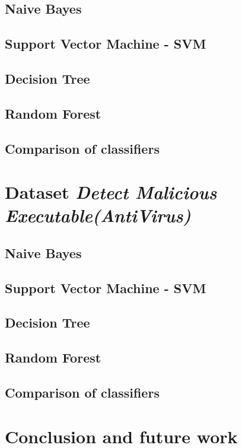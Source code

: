 \documentclass[11pt,a4paper,titlepage]{article}
\begin{document}
\subsection{Naive Bayes}
\subsection{Support Vector Machine - SVM}
\subsection{Decision Tree}
\subsection{Random Forest}
\subsection{Comparison of classifiers}

\section{Dataset \textit{Detect Malicious Executable(AntiVirus)}}

\subsection{Naive Bayes}
\subsection{Support Vector Machine - SVM}
\subsection{Decision Tree}
\subsection{Random Forest}
\subsection{Comparison of classifiers}

\section{Conclusion and future work}
\end{document}
